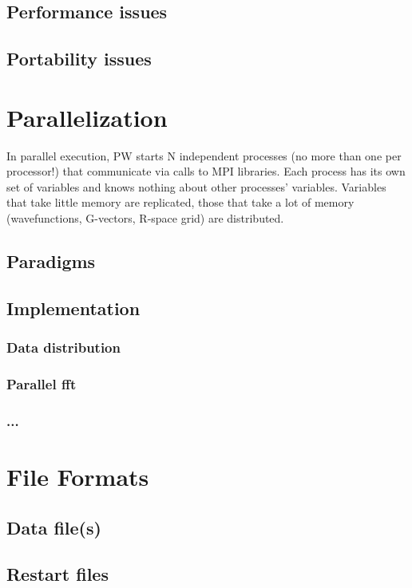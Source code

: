 \documentclass[12pt,a4paper]{article}
\begin{document}
\subsection{Performance issues}
\subsection{Portability issues}

\section{Parallelization}

In parallel execution, PW starts N independent
processes (no more than one per processor!)
that communicate via calls to MPI libraries. 
Each process has its own set of variables and knows 
nothing about other processes' variables. Variables 
that take little memory are replicated, those that 
take a lot of memory (wavefunctions, G-vectors, R-space
grid) are distributed.

\subsection{Paradigms}
\subsection{Implementation}
\subsubsection{Data distribution}
\subsubsection{Parallel fft}
\subsubsection{...}

\section{File Formats}
\subsection{Data file(s)}
\subsection{Restart files}
\end{document}
